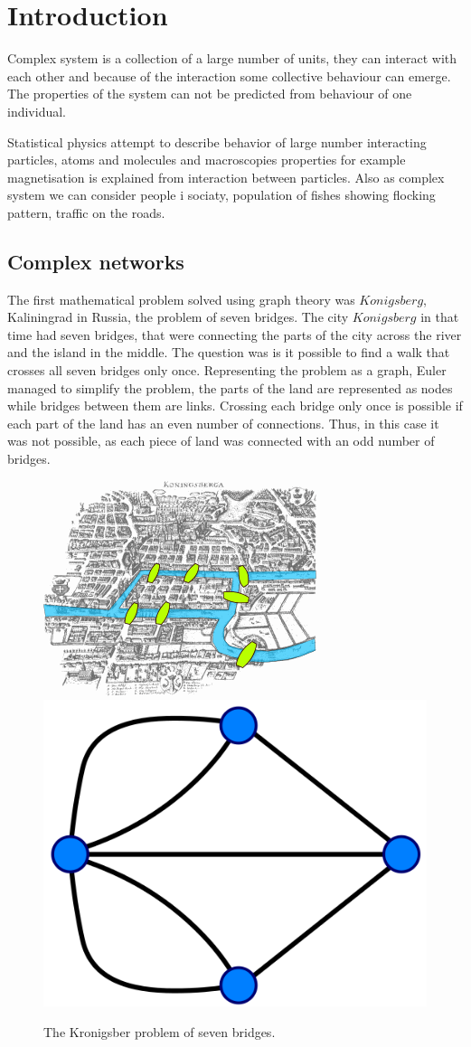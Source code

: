 \chapter{Introduction} %


Complex system is a collection of a large number of units, they can interact with each other and because of the interaction some collective behaviour can emerge. The properties of the system can not be predicted from behaviour of one individual. 

Statistical physics attempt to describe behavior of large number interacting particles, atoms and molecules and macroscopies properties for example magnetisation is explained from interaction between particles. Also as complex system we can consider people i sociaty, population of fishes showing flocking pattern, traffic on the roads. 

\section{Complex networks}

The first mathematical problem solved using graph theory was $Konigsberg$, Kaliningrad in Russia, the problem of seven bridges. The city $Konigsberg$ in that time had seven bridges, that were connecting the parts of the city across the river and the island in the middle. The question was is it possible to find a walk that crosses all seven bridges only once. Representing the problem as a graph, Euler managed to simplify the problem, the parts of the land are represented as nodes while bridges between them are links. Crossing each bridge only once is possible if each part of the land has an even number of connections. Thus, in this case it was not possible, as each piece of land was connected with an odd number of bridges.

\begin{figure}[h!]
	\centering
	\includegraphics[width=0.3\linewidth]{Figures/Konigsberg_bridges.png} \hspace{2cm}
	\includegraphics[width=0.3\linewidth]{Figures/Konigsberg_graph.png}
	\caption{The Kronigsber problem of seven bridges.}
	\label{fig:Krgraph}
\end{figure}

